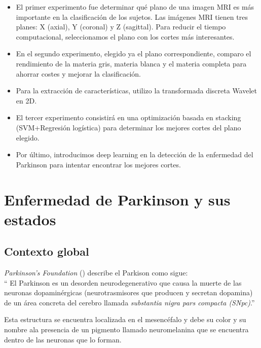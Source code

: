 \begin{itemize}
	\item El primer experimento fue determinar qué plano de una imagen MRI es más importante en la clasificación de los sujetos. Las imágenes MRI tienen tres planes: X (axial), Y (coronal) y Z (sagittal). Para reducir el tiempo computacional, seleccionamos el plano con los cortes más interesantes.
	
	\item En el segundo experimento, elegido ya el plano correspondiente, comparo el rendimiento de la materia gris, materia blanca y el materia completa para ahorrar costes y mejorar la clasificación.
	
	\item Para la extracción de características, utilizo la transformada discreta Wavelet en 2D.
	
	\item El tercer experimento consistirá en una optimización basada en stacking (SVM+Regresión logística) para determinar los mejores cortes del plano elegido.
	
	\item Por último, introducimos deep learning en la detección de la enfermedad del Parkinson para intentar encontrar los mejores cortes.
	
\end{itemize}


\section{Enfermedad de Parkinson y sus estados}

\subsection{Contexto global}

\textit{Parkinson's Foundation} (\cite{pf}) describe el Parkison como sigue: \\

`` El Parkinson es un desorden neurodegenerativo que causa la muerte de las neuronas dopaminérgicas (neurotrasmisores que producen y secretan dopamina) de un área concreta del cerebro llamada \textit{substantia nigra pars compacta (SNpc)}.''

Esta estructura se encuentra localizada en el mesencéfalo y debe su color y su nombre ala presencia de un pigmento llamado neuromelanina que se encuentra dentro de las neuronas que lo forman. 

